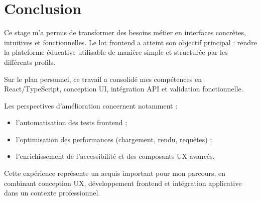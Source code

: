 \chapter*{Conclusion}

Ce stage m'a permis de transformer des besoins métier en interfaces concrètes, intuitives et fonctionnelles. Le lot frontend a atteint son objectif principal : rendre la plateforme éducative utilisable de manière simple et structurée par les différents profils.

Sur le plan personnel, ce travail a consolidé mes compétences en React/TypeScript, conception UI, intégration API et validation fonctionnelle.

Les perspectives d'amélioration concernent notamment :
\begin{itemize}
	\item l'automatisation des tests frontend ;
	\item l'optimisation des performances (chargement, rendu, requêtes) ;
	\item l'enrichissement de l'accessibilité et des composants UX avancés.
\end{itemize}

Cette expérience représente un acquis important pour mon parcours, en combinant conception UX, développement frontend et intégration applicative dans un contexte professionnel.
